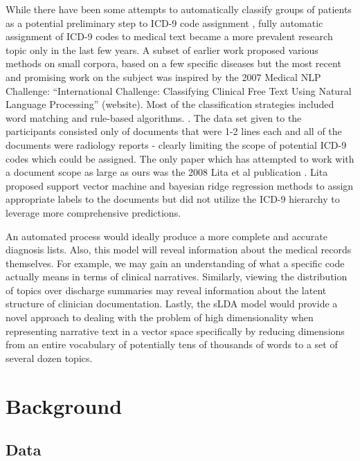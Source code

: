 \documentclass{article}
\begin{document}
While there have been some attempts to automatically classify groups
of patients as a potential preliminary step to ICD-9 code assignment
\citep{Ruch2008,FreitasJunior2006,RibeiroNeto2001,Brown2006}, fully
automatic assignment of ICD-9 codes to medical text became a more
prevalent research topic only in the last few years. A subset of earlier
work proposed various methods on small corpora, based on a few specific
diseases \citep{Rao2003} but the most recent and promising work on
the subject was inspired by the 2007 Medical NLP Challenge: \textquotedblleft{}International
Challenge: Classifying Clinical Free Text Using Natural Language Processing\textquotedblright{}
(website). Most of the classification strategies included word matching
and rule-based algorithms. \citep{Goldstein2007,Crammer2007,Farkas2008}.
The data set given to the participants consisted only of documents
that were 1-2 lines each and all of the documents were radiology reports
- clearly limiting the scope of potential ICD-9 codes which could
be assigned. The only paper which has attempted to work with a document
scope as large as ours was the 2008 Lita et al publication \citep{Lita2008}.
Lita proposed support vector machine and bayesian ridge regression
methods to assign appropriate labels to the documents but did not
utilize the ICD-9 hierarchy to leverage more comprehensive predictions.

An automated process would ideally produce a more complete and accurate
diagnosis lists. Also, this model will reveal information about the
medical records themselves. For example, we may gain an understanding
of what a specific code actually means in terms of clinical narratives.
Similarly, viewing the distribution of topics over discharge summaries
may reveal information about the latent structure of clinician documentation.
Lastly, the sLDA model would provide a novel approach to dealing with
the problem of high dimensionality when representing narrative text
in a vector space specifically by reducing dimensions from an entire
vocabulary of potentially tens of thousands of words to a set of several
dozen topics.


\section{Background}


\subsection{Data}
\end{document}
